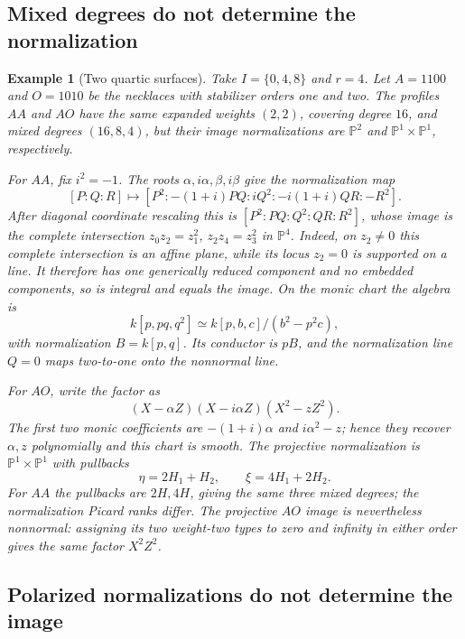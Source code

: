 \documentclass[10pt,fleqn]{article}
\numberwithin{equation}{section}
\newtheorem{example}[theorem]{Example}
\newcommand{\PP}{\mathbb P}
\begin{document}
\subsection{Mixed degrees do not determine the normalization}
\label{r24:separation:degrees}

\begin{example}[Two quartic surfaces]\label{v6:cond:quartic}
Take $I=\{0,4,8\}$ and $r=4$.  Let $A=1100$ and $O=1010$ be the
necklaces with stabilizer orders one and two.  The profiles $AA$ and
$AO$ have the same expanded weights $(2,2)$, covering degree $16$,
and mixed degrees $(16,8,4)$, but their image normalizations are
$\PP^2$ and $\PP^1\times\PP^1$, respectively.

For $AA$, fix $i^2=-1$.  The roots
$\alpha,i\alpha,\beta,i\beta$ give the normalization map
\[
 [P:Q:R]\longmapsto
 [P^2:-(1+i)PQ:iQ^2:-i(1+i)QR:-R^2].
\]
After diagonal coordinate rescaling this is
$[P^2:PQ:Q^2:QR:R^2]$, whose image is the complete intersection
$z_0z_2=z_1^2$, $z_2z_4=z_3^2$ in $\PP^4$.
Indeed, on $z_2\ne0$ this complete intersection is an
affine plane, while its locus $z_2=0$ is supported on a
line.  It therefore has one generically reduced
component and no embedded components, so is integral
and equals the image.  On the monic chart the algebra is
\[
 k[p,pq,q^2]\simeq k[p,b,c]/(b^2-p^2c),
\]
with normalization $B=k[p,q]$.  Its conductor is $pB$, and the
normalization line $Q=0$ maps two-to-one onto the nonnormal line.

For $AO$, write the factor as
\[
 (X-\alpha Z)(X-i\alpha Z)(X^2-zZ^2).
\]
The first two monic coefficients are $-(1+i)\alpha$ and
$i\alpha^2-z$; hence they recover $\alpha,z$ polynomially and this
chart is smooth.  The projective normalization is
$\PP^1\times\PP^1$ with pullbacks
\[
 \eta=2H_1+H_2,\qquad \xi=4H_1+2H_2.
\]
For $AA$ the pullbacks are $2H,4H$, giving the same three mixed degrees;
the normalization Picard ranks differ.  The projective $AO$ image is
nevertheless nonnormal: assigning its two weight-two types to zero and
infinity in either order gives the same factor $X^2Z^2$.
\end{example}

\subsection{Polarized normalizations do not determine the image}
\label{r24:separation:pullbacks}
\end{document}
